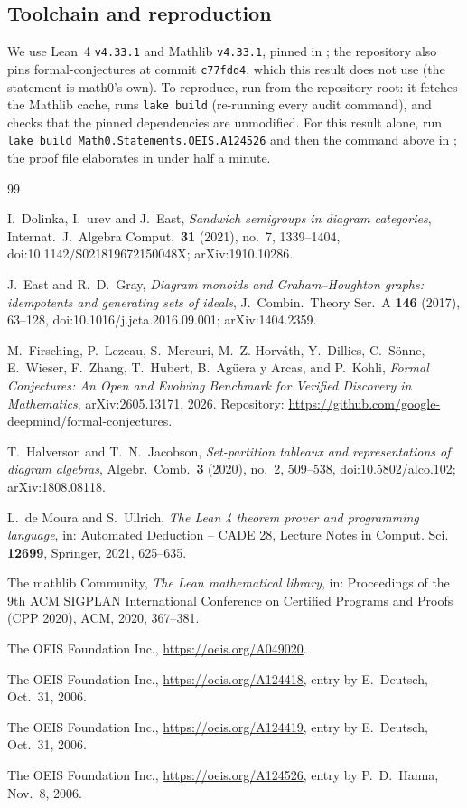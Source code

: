 \documentclass[11pt]{amsart}
\theoremstyle{plain}
\theoremstyle{definition}
\begin{document}
\subsection*{Toolchain and reproduction}
We use Lean~4 \cite{Lean4} \texttt{v4.33.1} and Mathlib \cite{Mathlib} \texttt{v4.33.1}, pinned in ; the repository also pins formal-conjectures \cite{FC} at commit \texttt{c77fdd4}, which this result does not use (the statement is math0's own).
To reproduce, run  from the repository root: it fetches the Mathlib cache, runs \texttt{lake build} (re-running every audit command), and checks that the pinned dependencies are unmodified.
For this result alone, run \texttt{lake build Math0.Statements.OEIS.A124526} and then the command above in ; the proof file elaborates in under half a minute.

{\small
\begin{thebibliography}{99}

I.~Dolinka, I.~\DJ ur\dj ev and J.~East, \emph{Sandwich semigroups in diagram categories}, Internat.\ J.\ Algebra Comput.\ \textbf{31} (2021), no.~7, 1339--1404, doi:10.1142/S021819672150048X; arXiv:1910.10286.

J.~East and R.~D.~Gray, \emph{Diagram monoids and Graham--Houghton graphs: idempotents and generating sets of ideals}, J.\ Combin.\ Theory Ser.~A \textbf{146} (2017), 63--128, doi:10.1016/j.jcta.2016.09.001; arXiv:1404.2359.

M.~Firsching, P.~Lezeau, S.~Mercuri, M.~Z. Horv\'ath, Y.~Dillies, C.~S\"onne, E.~Wieser, F.~Zhang, T.~Hubert, B.~Ag\"uera y Arcas, and P.~Kohli, \emph{Formal Conjectures: An Open and Evolving Benchmark for Verified Discovery in Mathematics}, arXiv:2605.13171, 2026. Repository: \url{https://github.com/google-deepmind/formal-conjectures}.

T.~Halverson and T.~N.~Jacobson, \emph{Set-partition tableaux and representations of diagram algebras}, Algebr.\ Comb.\ \textbf{3} (2020), no.~2, 509--538, doi:10.5802/alco.102; arXiv:1808.08118.

L.~de Moura and S.~Ullrich, \emph{The Lean 4 theorem prover and programming language}, in: Automated Deduction -- CADE 28, Lecture Notes in Comput. Sci. \textbf{12699}, Springer, 2021, 625--635.

The mathlib Community, \emph{The Lean mathematical library}, in: Proceedings of the 9th ACM SIGPLAN International Conference on Certified Programs and Proofs (CPP 2020), ACM, 2020, 367--381.

The OEIS Foundation Inc., \url{https://oeis.org/A049020}.

The OEIS Foundation Inc., \url{https://oeis.org/A124418}, entry by E.~Deutsch, Oct.~31, 2006.

The OEIS Foundation Inc., \url{https://oeis.org/A124419}, entry by E.~Deutsch, Oct.~31, 2006.

The OEIS Foundation Inc., \url{https://oeis.org/A124526}, entry by P.~D.~Hanna, Nov.~8, 2006.

\end{thebibliography}
}
\end{document}
